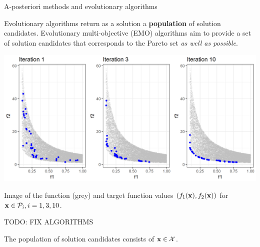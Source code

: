 \begin{frame}[allowframebreaks]{A-posteriori methods and evolutionary algorithms}

Evolutionary algorithms return as a solution a \textbf{population} of solution candidates. Evolutionary multi-objective (EMO) algorithms aim to provide a set of solution candidates that corresponds to the Pareto set \textit{as well as possible}.

\vspace*{-0.4cm}

\begin{center}
\includegraphics[width = 0.7\linewidth]{images/EA-steps.png}
\end{center}

\vspace*{-0.4cm}

\begin{footnotesize}
Image of the function (grey) and target function values $(f_1(\mathbf{x}), f_2(\mathbf{x}))$ for $\mathbf{x} \in \mathcal{P}_i, i = 1, 3, 10$.
\end{footnotesize}

\framebreak
TODO: FIX ALGORITHMS

The population of solution candidates consists of $\mathbf{x} \in \mathcal{X}$.

\end{frame}



